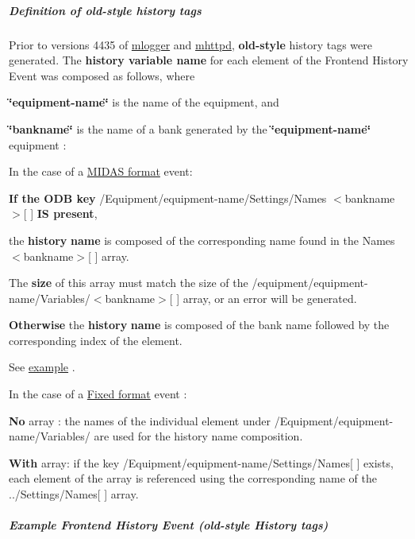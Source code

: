 \label{F_History_logging_idx_history_tags_old}
\hypertarget{F_History_logging_idx_history_tags_old}{}
\hypertarget{F_History_logging_F_history_old_tags}{}\subparagraph{Definition of old-\/style history tags}\label{F_History_logging_F_history_old_tags}
Prior to versions 4435 of \hyperlink{F_Logging_F_mlogger_utility}{mlogger} and \hyperlink{RC_mhttpd_utility}{mhttpd}, {\bfseries old-\/style} history tags were generated. The {\bfseries history variable name} for each element of the Frontend History Event was composed as follows, where 
\begin{DoxyItemize}
\item {\bfseries \char`\"{}equipment-\/name\char`\"{}} is the name of the equipment, and 
\item {\bfseries \char`\"{}bankname\char`\"{}} is the name of a bank generated by the {\bfseries \char`\"{}equipment-\/name\char`\"{}} equipment :


\begin{DoxyItemize}
\item In the case of a \hyperlink{FE_Data_format_FE_Midas_format}{MIDAS format} event:


\begin{DoxyItemize}
\item {\bfseries If the ODB key} /Equipment/equipment-\/name/Settings/Names $<$bankname$>$\mbox{[} \mbox{]} {\bfseries IS present}, 
\begin{DoxyItemize}
\item the {\bfseries history} {\bfseries name} is composed of the corresponding name found in the  Names $<$bankname$>$\mbox{[} \mbox{]} array. 
\item The {\bfseries size} of this array must match the size of the /equipment/equipment-\/name/Variables/$<$bankname$>$\mbox{[} \mbox{]} array, or an error will be generated. 
\end{DoxyItemize}
\item {\bfseries Otherwise} the {\bfseries history} {\bfseries name} is composed of the bank name followed by the corresponding index of the element. 
\end{DoxyItemize}See \hyperlink{RC_mhttpd_Equipment_page_RC_mhttpd_Equipment_example4}{example} .


\item In the case of a \hyperlink{FE_bank_construction_FE_FIXED_event_readout}{Fixed format} event :


\begin{DoxyItemize}
\item {\bfseries No} array : the names of the individual element under /Equipment/equipment-\/name/Variables/ are used for the history name composition. 
\item {\bfseries With} array: if the key /Equipment/equipment-\/name/Settings/Names\mbox{[} \mbox{]} exists, each element of the array is referenced using the corresponding name of the ../Settings/Names\mbox{[} \mbox{]} array. 
\end{DoxyItemize}
\end{DoxyItemize}
\end{DoxyItemize}\hypertarget{F_History_logging_F_example_FE_history_event}{}\subparagraph{Example Frontend History Event (old-\/style History tags)}\label{F_History_logging_F_example_FE_history_event}
